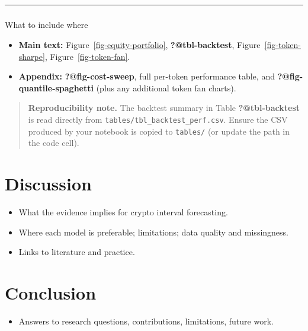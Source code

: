 \documentclass[
  a4paper,
  DIV=11,
  numbers=noendperiod]{scrreprt}
\makeatletter
\let\oldparagraph\paragraph
\renewcommand{\paragraph}{
    \@ifstar
      \xxxParagraphStar
      \xxxParagraphNoStar
  }
\newcommand{\xxxParagraphStar}[1]{\oldparagraph*{#1}\mbox{}}
\newcommand{\xxxParagraphNoStar}[1]{\oldparagraph{#1}\mbox{}}
\providecommand{\tightlist}{%
  \setlength{\itemsep}{0pt}\setlength{\parskip}{0pt}}
\makeatother
\begin{document}
\begin{center}\rule{0.5\linewidth}{0.5pt}\end{center}

\paragraph{What to include where}\label{what-to-include-where}

\begin{itemize}
\tightlist
\item
  \textbf{Main text:} Figure~\ref{fig-equity-portfolio},
  \textbf{?@tbl-backtest}, Figure~\ref{fig-token-sharpe},
  Figure~\ref{fig-token-fan}.
\item
  \textbf{Appendix:} \textbf{?@fig-cost-sweep}, full per-token
  performance table, and \textbf{?@fig-quantile-spaghetti} (plus any
  additional token fan charts).
\end{itemize}

\begin{quote}
\textbf{Reproducibility note.} The backtest summary in Table
\textbf{?@tbl-backtest} is read directly from
\texttt{tables/tbl\_backtest\_perf.csv}. Ensure the CSV produced by your
notebook is copied to \texttt{tables/} (or update the path in the code
cell).
\end{quote}


\chapter{Discussion}\label{discussion}

\begin{itemize}
\tightlist
\item
  What the evidence implies for crypto interval forecasting.
\item
  Where each model is preferable; limitations; data quality and
  missingness.
\item
  Links to literature and practice.
\end{itemize}


\chapter{Conclusion}\label{conclusion}

\begin{itemize}
\tightlist
\item
  Answers to research questions, contributions, limitations, future
  work.
\end{itemize}
\end{document}
